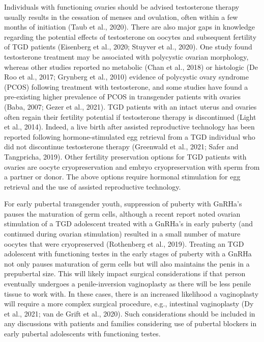 \documentclass[
]{book}
\begin{document}
Individuals with functioning ovaries should
be advised testosterone therapy usually results
in the cessation of menses and ovulation, often
within a few months of initiation (Taub et al.,
2020). There are also major gaps in knowledge
regarding the potential effects of testosterone
on oocytes and subsequent fertility of TGD
patients (Eisenberg et al., 2020; Stuyver et al.,
2020). One study found testosterone treatment
may be associated with polycystic ovarian morphology, whereas other studies reported no
metabolic (Chan et al., 2018) or histologic (De
Roo et al., 2017; Grynberg et al., 2010) evidence of polycystic ovary syndrome (PCOS)
following treatment with testosterone, and some
studies have found a pre-existing higher prevalence of PCOS in transgender patients with
ovaries (Baba, 2007; Gezer et al., 2021). TGD
patients with an intact uterus and ovaries often
regain their fertility potential if testosterone
therapy is discontinued (Light et al., 2014).
Indeed, a live birth after assisted reproductive
technology has been reported following
hormone-stimulated egg retrieval from a TGD
individual who did not discontinue testosterone
therapy (Greenwald et al., 2021; Safer and
Tangpricha, 2019). Other fertility preservation
options for TGD patients with ovaries are
oocyte cryopreservation and embryo cryopreservation with sperm from a partner or donor.
The above options require hormonal stimulation for egg retrieval and the use of assisted
reproductive technology.

For early pubertal transgender youth, suppression of puberty with GnRHa's pauses the maturation of germ cells, although a recent report
noted ovarian stimulation of a TGD adolescent
treated with a GnRHa's in early puberty (and
continued during ovarian stimulation) resulted in
a small number of mature oocytes that were cryopreserved (Rothenberg et al., 2019). Treating an
TGD adolescent with functioning testes in the
early stages of puberty with a GnRHa not only
pauses maturation of germ cells but will also
maintains the penis in a prepubertal size. This
will likely impact surgical considerations if that
person eventually undergoes a penile-inversion
vaginoplasty as there will be less penile tissue to
work with. In these cases, there is an increased
likelihood a vaginoplasty will require a more
complex surgical procedure, e.g., intestinal vaginoplasty (Dy et al., 2021; van de Grift et al.,
2020). Such considerations should be included in
any discussions with patients and families considering use of pubertal blockers in early pubertal
adolescents with functioning testes.
\end{document}
